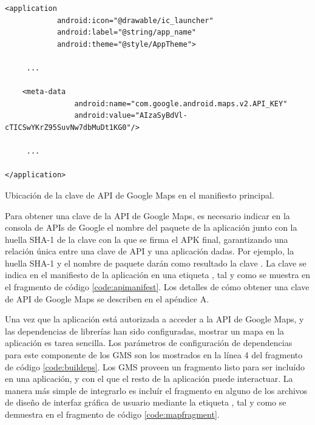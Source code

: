 \begin{listing}[h] 
\begin{verbatim}
<application
            android:icon="@drawable/ic_launcher"
            android:label="@string/app_name"
            android:theme="@style/AppTheme">

     ...
        
    <meta-data
                android:name="com.google.android.maps.v2.API_KEY"
                android:value="AIzaSyBdVl-cTICSwYKrZ95SuvNw7dbMuDt1KG0"/>
    
     ...    
    
</application>
\end{verbatim}
\caption{Ubicación de la clave de API de Google Maps en el manifiesto principal.}
\label{code:apimanifest}
\end{listing}

    Para obtener una clave de la API de Google Maps, es necesario indicar  en la consola de APIs de Google el nombre del paquete de la aplicación junto con la huella SHA-1 de la clave con la que se firma el APK final, garantizando una relación única entre una clave de API y una aplicación dadas. Por ejemplo, la huella SHA-1  y el nombre de paquete  darán como resultado la clave . La clave se indica en el manifiesto de la aplicación en una etiqueta , tal y como se muestra en el fragmento de código \ref{code:apimanifest}. Los detalles de cómo obtener una clave de API de Google Maps se describen en el apéndice A.
    
    Una vez que la aplicación está autorizada a acceder a la API de Google Maps, y las dependencias de librerías han sido configuradas, mostrar un mapa en la aplicación es tarea sencilla. Los parámetros de configuración de dependencias para este componente de los \ac{GMS} son los mostrados en la línea 4 del fragmento de código \ref{code:buildeps}. Los \ac{GMS} proveen un fragmento  listo para ser incluído en una aplicación, y con el que el resto de la aplicación puede interactuar. La manera más simple de integrarlo es incluír el fragmento en alguno de los archivos de diseño de interfaz gráfica de usuario mediante la etiqueta , tal y como se demuestra en el fragmento de código \ref{code:mapfragment}.
           
